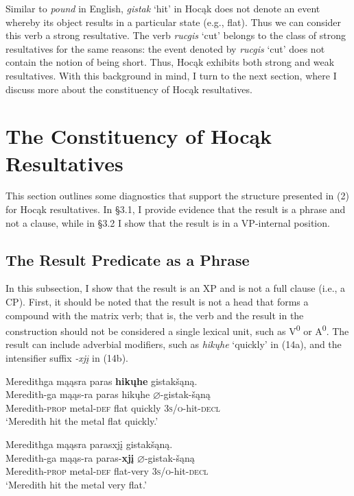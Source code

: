 \documentclass[output=paper]{LSP/langsci}
\begin{document}
Similar to \textit{pound} in English, \textit{gistak} `hit' in Hocąk does not denote an event whereby its object results in a particular state (e.g., flat). Thus we can consider this verb a strong resultative. The verb \textit{rucgis} `cut' belongs to the class of strong resultatives for the same reasons: the event denoted by \textit{rucgis} `cut' does not contain the notion of being short. Thus, Hocąk exhibits both strong and weak resultatives. With this background in mind, I turn to the next section, where I discuss more about the constituency of Hocąk resultatives.

\section{The Constituency of Hocąk Resultatives}

This section outlines some diagnostics that support the structure presented in (2) for Hocąk resultatives. In \S 3.1, I provide evidence that the result is a phrase and not a clause, while in \S 3.2 I show that the result is in a VP-internal position.

\subsection{The Result Predicate as a Phrase}

In this subsection, I show that the result is an XP and is not a full clause (i.e., a CP). First, it should be noted that the result is not a head that forms a compound with the matrix verb; that is, the verb and the result in the construction should not be considered a single lexical unit, such as V\textsuperscript{0} or A\textsuperscript{0}. The result can include adverbial modifiers, such as \textit{hikųhe} `quickly' in (14a), and the intensifier suffix \textit{-xjį} in (14b).

\begin{exe}
\ex
\begin{xlist}

\ex \glll Meredithga mąąsra paras \textbf{hikųhe} gistakšąną. \\
 Meredith-ga mąąs-ra paras hikųhe {$\varnothing$}-gistak-šąną\\
Meredith-\textsc{prop} metal-\textsc{def} flat quickly \textsc{3s/o}-hit-\textsc{decl}\\ 
\glt `Meredith hit the metal flat quickly.'


\ex \glll Meredithga mąąsra parasxjį gistakšąną.\\
 Meredith-ga mąąs-ra paras-\textbf{xjį} {$\varnothing$}-gistak-šąną\\
Meredith-\textsc{prop} metal-\textsc{def} flat-very  \textsc{3s/o}-hit-\textsc{decl}\\
\glt `Meredith hit the metal very flat.'

\end{xlist}
\end{exe}
\end{document}
